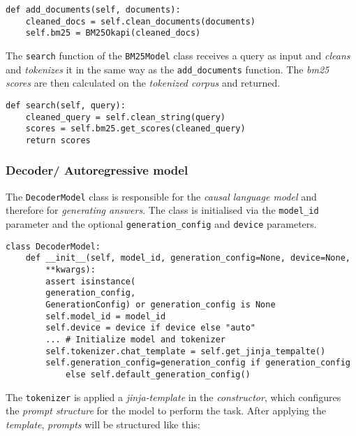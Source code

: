 \documentclass{article}
\begin{document}
\begin{lstlisting}[backgroundcolor = \color{lightgray!25}]
def add_documents(self, documents):
    cleaned_docs = self.clean_documents(documents)
    self.bm25 = BM25Okapi(cleaned_docs)
\end{lstlisting}

The \colorbox{lightgray!25}{\lstinline{search}} function of the \colorbox{lightgray!25}{\lstinline{BM25Model}} class receives a query as input and \textit{cleans} and \textit{tokenizes} it in the same way as the \colorbox{lightgray!25}{\lstinline{add_documents}} function. The \textit{bm25 scores} are then calculated on the \textit{tokenized corpus} and returned.

\begin{lstlisting}[backgroundcolor = \color{lightgray!25}]
def search(self, query):
    cleaned_query = self.clean_string(query)
    scores = self.bm25.get_scores(cleaned_query)
    return scores
\end{lstlisting}

\subsubsection{Decoder/ Autoregressive model}
The \colorbox{lightgray!25}{\lstinline{DecoderModel}} class is responsible for the \textit{causal language model} and therefore for \textit{generating answers}. The class is initialised via the \colorbox{lightgray!25}{\lstinline{model_id}} parameter and the optional \colorbox{lightgray!25}{\lstinline{generation_config}} and \colorbox{lightgray!25}{\lstinline{device}} parameters.

\begin{lstlisting}[backgroundcolor = \color{lightgray!25}]
class DecoderModel:
    def __init__(self, model_id, generation_config=None, device=None, 
        **kwargs):     
        assert isinstance(
        generation_config, 
        GenerationConfig) or generation_config is None
        self.model_id = model_id
        self.device = device if device else "auto"
        ... # Initialize model and tokenizer
        self.tokenizer.chat_template = self.get_jinja_tempalte()
        self.generation_config=generation_config if generation_config 
            else self.default_generation_config()
\end{lstlisting}

The \colorbox{lightgray!25}{\lstinline{tokenizer}} is applied a \textit{jinja-template} in the \textit{constructor}, which configures the \textit{prompt structure} for the model to perform the task. After applying the \textit{template}, \textit{prompts} will be structured like this: 
\end{document}
